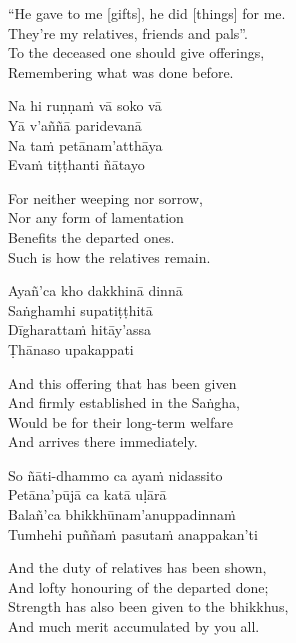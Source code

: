 \begin{english-verses}
  ``He gave to me [gifts], he did [things] for me.\\
  They're my relatives, friends and pals''.\\
  To the deceased one should give offerings,\\
  Remembering what was done before.
\end{english-verses}

\begin{pali-hang-continued}
  Na hi ruṇṇaṁ vā soko vā\\
  Yā v'aññā paridevanā\\
  Na taṁ petānam'atthāya\\
  Evaṁ tiṭṭhanti ñātayo
\end{pali-hang-continued}

\begin{english-verses}
  For neither weeping nor sorrow,\\
  Nor any form of lamentation\\
  Benefits the departed ones.\\
  Such is how the relatives remain.
\end{english-verses}

\begin{pali-hang-continued}
  Ayañ'ca kho dakkhinā dinnā\\
  Saṅghamhi supatiṭṭhitā\\
  Dīgharattaṁ hitāy'assa\\
  Ṭhānaso upakappati
\end{pali-hang-continued}

\begin{english-verses}
  And this offering that has been given\\
  And firmly established in the Saṅgha,\\
  Would be for their long-term welfare\\
  And arrives there immediately.
\end{english-verses}

\begin{pali-hang-continued}
  So ñāti-dhammo ca ayaṁ nidassito\\
  Petāna'pūjā ca katā uḷārā\\
  Balañ'ca bhikkhūnam'anuppadinnaṁ\\
  Tumhehi puññaṁ pasutaṁ anappakan'ti
\end{pali-hang-continued}

\begin{english-verses}
  And the duty of relatives has been shown,\\
  And lofty honouring of the departed done;\\
  Strength has also been given to the bhikkhus,\\
  And much merit accumulated by you all.
\end{english-verses}

